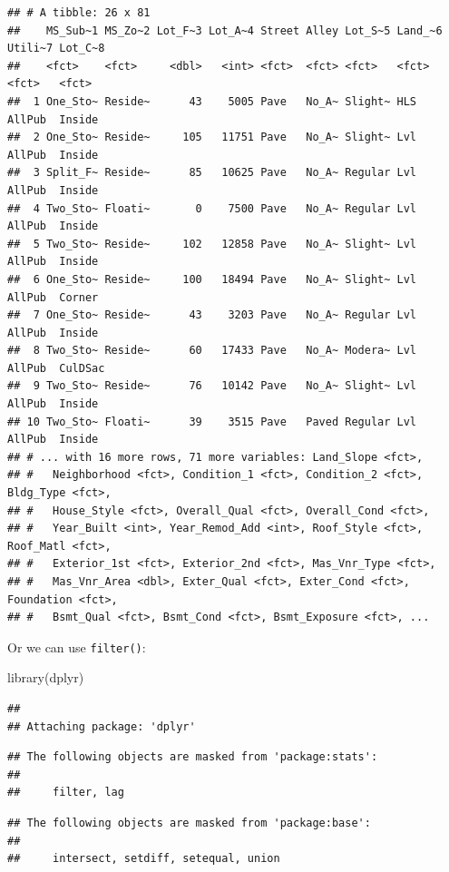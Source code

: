 \documentclass[
]{book}
\newenvironment{Shaded}{\begin{snugshade}}{\end{snugshade}}
\newcommand{\FunctionTok}[1]{\textcolor[rgb]{0.00,0.00,0.00}{#1}}
\newcommand{\NormalTok}[1]{#1}
\theoremstyle{definition}
\theoremstyle{definition}
\theoremstyle{definition}
\theoremstyle{definition}
\theoremstyle{remark}
\begin{document}
\begin{verbatim}
## # A tibble: 26 x 81
##    MS_Sub~1 MS_Zo~2 Lot_F~3 Lot_A~4 Street Alley Lot_S~5 Land_~6 Utili~7 Lot_C~8
##    <fct>    <fct>     <dbl>   <int> <fct>  <fct> <fct>   <fct>   <fct>   <fct>  
##  1 One_Sto~ Reside~      43    5005 Pave   No_A~ Slight~ HLS     AllPub  Inside 
##  2 One_Sto~ Reside~     105   11751 Pave   No_A~ Slight~ Lvl     AllPub  Inside 
##  3 Split_F~ Reside~      85   10625 Pave   No_A~ Regular Lvl     AllPub  Inside 
##  4 Two_Sto~ Floati~       0    7500 Pave   No_A~ Regular Lvl     AllPub  Inside 
##  5 Two_Sto~ Reside~     102   12858 Pave   No_A~ Slight~ Lvl     AllPub  Inside 
##  6 One_Sto~ Reside~     100   18494 Pave   No_A~ Slight~ Lvl     AllPub  Corner 
##  7 One_Sto~ Reside~      43    3203 Pave   No_A~ Regular Lvl     AllPub  Inside 
##  8 Two_Sto~ Reside~      60   17433 Pave   No_A~ Modera~ Lvl     AllPub  CulDSac
##  9 Two_Sto~ Reside~      76   10142 Pave   No_A~ Slight~ Lvl     AllPub  Inside 
## 10 Two_Sto~ Floati~      39    3515 Pave   Paved Regular Lvl     AllPub  Inside 
## # ... with 16 more rows, 71 more variables: Land_Slope <fct>,
## #   Neighborhood <fct>, Condition_1 <fct>, Condition_2 <fct>, Bldg_Type <fct>,
## #   House_Style <fct>, Overall_Qual <fct>, Overall_Cond <fct>,
## #   Year_Built <int>, Year_Remod_Add <int>, Roof_Style <fct>, Roof_Matl <fct>,
## #   Exterior_1st <fct>, Exterior_2nd <fct>, Mas_Vnr_Type <fct>,
## #   Mas_Vnr_Area <dbl>, Exter_Qual <fct>, Exter_Cond <fct>, Foundation <fct>,
## #   Bsmt_Qual <fct>, Bsmt_Cond <fct>, Bsmt_Exposure <fct>, ...
\end{verbatim}

Or we can use \texttt{filter()}:

\begin{Shaded}
\begin{Highlighting}[]
\FunctionTok{library}\NormalTok{(dplyr)}
\end{Highlighting}
\end{Shaded}

\begin{verbatim}
## 
## Attaching package: 'dplyr'
\end{verbatim}

\begin{verbatim}
## The following objects are masked from 'package:stats':
## 
##     filter, lag
\end{verbatim}

\begin{verbatim}
## The following objects are masked from 'package:base':
## 
##     intersect, setdiff, setequal, union
\end{verbatim}
\end{document}
